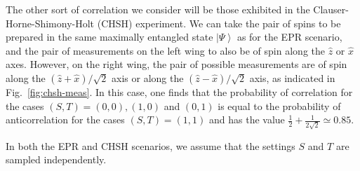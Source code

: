 \documentclass[letterpaper,onecolumn,nofootinbib]{revtex4}
\begin{document}
The other sort of correlation we consider will be those exhibited in the Clauser-Horne-Shimony-Holt (CHSH) experiment. We can take the pair of spins to be prepared in the same maximally entangled state $%
\left\vert \Psi \right\rangle $ as for the EPR scenario, and the pair of
measurements on the left wing to also be of spin along the $\hat{z}$ or $%
\hat{x}$ axes. However, on the right wing, the pair of possible
measurements are of spin along the $(\hat{z}+\hat{x})/\sqrt{2}$ axis or along the $(\hat{
z}-\hat{x})/\sqrt{2}$ axis, as indicated in Fig.~\ref{fig:chsh-meas}. In this case, one finds that the probability of correlation for the cases $\left(
S,T\right) =(0,0),(1,0)$ and $(0,1)$ is equal to the probability of
anticorrelation for the cases $\left( S,T\right) =(1,1)$ and has the value $%
\frac{1}{2}+\frac{1}{2\sqrt{2}}\simeq 0.85.$

In both the EPR and CHSH scenarios, we assume that the settings $S$ and $T$ are sampled independently.
\end{document}
